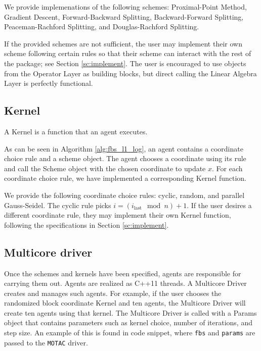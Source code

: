 We provide implemenations of the following schemes:  Proximal-Point Method,  Gradient Descent, Forward-Backward Splitting, Backward-Forward Splitting, Peaceman-Rachford Splitting, and Douglas-Rachford Splitting.

If the provided schemes are not sufficient, the user may implement their own scheme following certain rules so that their scheme can interact with the rest of the package; see Section \ref{sc:implement}.
The user is encouraged to use objects from the Operator Layer as building blocks, but direct calling the Linear Algebra Layer is perfectly functional. %

\subsection{Kernel}
A Kernel is a function that an agent executes.

As can be seen in Algorithm \ref{alg:fbs_l1_log}, an agent contains a coordinate choice rule and a scheme object.
The agent chooses a coordinate using its rule and call the Scheme object with the chosen coordinate to update $x$.
For each coordinate choice rule, we have implemented a corresponding Kernel function.

We provide the following coordinate choice rules: cyclic, random, and parallel Gauss-Seidel. The cyclic rule picks $i=(i_\mathrm{last} \mod n)+1$. 
If the user desires a different coordinate rule, they may implement their own Kernel function, following the specifications in Section \ref{sc:implement}.


\subsection{Multicore driver}

Once the schemes and kernels have been specified, agents are responsible for carrying them out. Agents are realized as C++11 threads.
A Multicore Driver creates and manages such agents.
For example, if the user chooses the randomized block coordinate Kernel and ten agents, the Multicore Driver will create ten agents using that kernel. %
The Multicore Driver is called with a Params object that contains parameters such as kernel choice, number of iterations, and step size.
An example of this is found in code snippet, where \texttt{fbs} and \texttt{params} are passed to the \texttt{MOTAC} driver.

